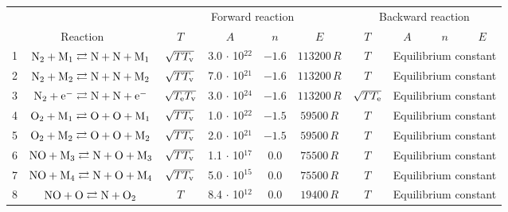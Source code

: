 \documentclass{warpdoc}
\renewcommand{\fontsizetable}{\footnotesize\scalefont{0.9}}
\begin{document}
%
\begin{table}[t]
\fontsizetable
\begin{center}
\begin{threeparttable}
\begin{tabular}{cccccccccc} 
\toprule
~&~&\multicolumn{4}{c}{Forward reaction} & \multicolumn{4}{c}{Backward reaction} \\
 \cmidrule(lr){3-6}\cmidrule(lr){7-10}
\multicolumn{2}{c}{Reaction} & $T$ & $A$ & $n$ & $E$ & $T$  & $A$ & $n$ & $E$ \\ 
\midrule
1 & $\rm N_2 + M_1 \rightleftarrows N + N + M_1$ & $\sqrt{T T_{\rm v}}$  & 3.0 $\cdot$ 10$^{22}$  & $-1.6$ & $113200 \, R$  & $T$ &\multicolumn{3}{c}{Equilibrium constant} \\

2 & $\rm N_2 + M_2 \rightleftarrows N + N + M_2$ & $\sqrt{T T_{\rm v}}$  & 7.0 $\cdot$ 10$^{21}$  & $-1.6$ & $113200 \, R$ & $T$ & \multicolumn{3}{c}{Equilibrium constant}  \\

3 & $\rm N_2 + e^- \rightleftarrows N + N + e^-$ & $\sqrt{T_{\rm e} T_{\rm v}}$ & 3.0 $\cdot$ 10$^{24}$  & $-1.6$ & $113200 \, R$ & $\sqrt{T T_{\rm e}}$ & \multicolumn{3}{c}{Equilibrium constant} \\

4 & $\rm O_2 + M_1 \rightleftarrows O + O + M_1$ & $\sqrt{T T_{\rm v}}$  & 1.0 $\cdot$ 10$^{22}$  & $-1.5$ & $59500 \, R$ & $T$ & \multicolumn{3}{c}{Equilibrium constant} \\

5 & $\rm O_2 + M_2 \rightleftarrows O + O + M_2$ & $\sqrt{T T_{\rm v}}$  & 2.0 $\cdot$ 10$^{21}$  & $-1.5$ & $59500 \, R$ & $T$ & \multicolumn{3}{c}{Equilibrium constant} \\

6 & $\rm NO + M_3 \rightleftarrows N + O + M_3$ & $\sqrt{T T_{\rm v}}$  & 1.1 $\cdot$ 10$^{17}$  & 0.0 & $75500 \, R$ & $T$ & \multicolumn{3}{c}{Equilibrium constant} \\

7 & $\rm NO + M_4 \rightleftarrows N + O + M_4$ & $\sqrt{T T_{\rm v}}$  & 5.0 $\cdot$ 10$^{15}$  & 0.0 & $75500 \, R$ & $T$ & \multicolumn{3}{c}{Equilibrium constant}  \\

8 & $\rm NO + O \rightleftarrows N + O_2 $ & $T$  & 8.4 $\cdot$ 10$^{12}$  & 0.0 & $19400 \, R$ & $T$ & \multicolumn{3}{c}{Equilibrium constant}  \\


\end{tabular}
\end{threeparttable}
\end{center}
\end{table}
\end{document}
